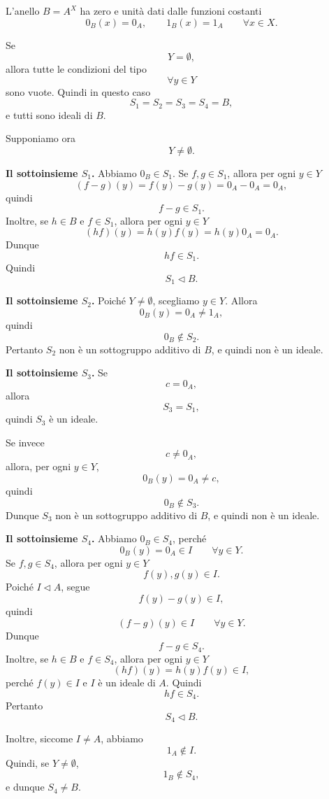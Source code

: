 \documentclass[a4paper]{article}
\begin{document}
\begin{radioactive}
\begin{snippetsolution}{}
    L'anello \(B=A^X\) ha zero e unità dati dalle funzioni costanti
    \[
        0_B(x)=0_A,
        \qquad
        1_B(x)=1_A
        \qquad
        \forall x\in X.
    \]

    Se
    \[
        Y=\emptyset,
    \]
    allora tutte le condizioni del tipo
    \[
        \forall y\in Y
    \]
    sono vuote. Quindi in questo caso
    \[
        S_1=S_2=S_3=S_4=B,
    \]
    e tutti sono ideali di \(B\).

    Supponiamo ora
    \[
        Y\neq\emptyset.
    \]

    \textbf{Il sottoinsieme \(S_1\).}
    Abbiamo \(0_B\in S_1\). Se \(f,g\in S_1\), allora per ogni \(y\in Y\)
    \[
        (f-g)(y)=f(y)-g(y)=0_A-0_A=0_A,
    \]
    quindi
    \[
        f-g\in S_1.
    \]
    Inoltre, se \(h\in B\) e \(f\in S_1\), allora per ogni \(y\in Y\)
    \[
        (hf)(y)=h(y)f(y)=h(y)0_A=0_A.
    \]
    Dunque
    \[
        hf\in S_1.
    \]
    Quindi
    \[
        S_1\triangleleft B.
    \]

    \textbf{Il sottoinsieme \(S_2\).}
    Poiché \(Y\neq\emptyset\), scegliamo \(y\in Y\). Allora
    \[
        0_B(y)=0_A\neq 1_A,
    \]
    quindi
    \[
        0_B\notin S_2.
    \]
    Pertanto \(S_2\) non è un sottogruppo additivo di \(B\), e quindi non è un ideale.

    \textbf{Il sottoinsieme \(S_3\).}
    Se
    \[
        c=0_A,
    \]
    allora
    \[
        S_3=S_1,
    \]
    quindi \(S_3\) è un ideale.

    Se invece
    \[
        c\neq 0_A,
    \]
    allora, per ogni \(y\in Y\),
    \[
        0_B(y)=0_A\neq c,
    \]
    quindi
    \[
        0_B\notin S_3.
    \]
    Dunque \(S_3\) non è un sottogruppo additivo di \(B\), e quindi non è un ideale.

    \textbf{Il sottoinsieme \(S_4\).}
    Abbiamo \(0_B\in S_4\), perché
    \[
        0_B(y)=0_A\in I
        \qquad
        \forall y\in Y.
    \]
    Se \(f,g\in S_4\), allora per ogni \(y\in Y\)
    \[
        f(y),g(y)\in I.
    \]
    Poiché \(I\triangleleft A\), segue
    \[
        f(y)-g(y)\in I,
    \]
    quindi
    \[
        (f-g)(y)\in I
        \qquad
        \forall y\in Y.
    \]
    Dunque
    \[
        f-g\in S_4.
    \]
    Inoltre, se \(h\in B\) e \(f\in S_4\), allora per ogni \(y\in Y\)
    \[
        (hf)(y)=h(y)f(y)\in I,
    \]
    perché \(f(y)\in I\) e \(I\) è un ideale di \(A\). Quindi
    \[
        hf\in S_4.
    \]
    Pertanto
    \[
        S_4\triangleleft B.
    \]

    Inoltre, siccome \(I\neq A\), abbiamo
    \[
        1_A\notin I.
    \]
    Quindi, se \(Y\neq\emptyset\),
    \[
        1_B\notin S_4,
    \]
    e dunque \(S_4\neq B\).
\end{snippetsolution}
\end{radioactive}
\end{document}
